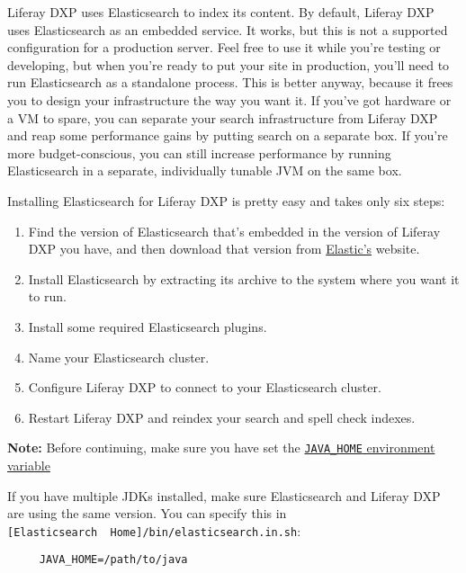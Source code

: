 Liferay DXP uses Elasticsearch to index its content. By default,
Liferay DXP uses Elasticsearch as an embedded service. It works, but this
is not a supported configuration for a production server. Feel free to
use it while you're testing or developing, but when you're ready to put
your site in production, you'll need to run Elasticsearch as a
standalone process. This is better anyway, because it frees you to
design your infrastructure the way you want it. If you've got hardware
or a VM to spare, you can separate your search infrastructure from
Liferay DXP and reap some performance gains by putting search on a
separate box. If you're more budget-conscious, you can still increase
performance by running Elasticsearch in a separate, individually tunable
JVM on the same box.

Installing Elasticsearch for Liferay DXP is pretty easy and takes only
six steps:

\begin{enumerate}
\def\labelenumi{\arabic{enumi}.}
\item
  Find the version of Elasticsearch that's embedded in the version of
  Liferay DXP you have, and then download that version from
  \href{https://www.elastic.co}{Elastic's} website.
\item
  Install Elasticsearch by extracting its archive to the system where
  you want it to run.
\item
  Install some required Elasticsearch plugins.
\item
  Name your Elasticsearch cluster.
\item
  Configure Liferay DXP to connect to your Elasticsearch cluster.
\item
  Restart Liferay DXP and reindex your search and spell check indexes.
\end{enumerate}

\noindent\hrulefill

\textbf{Note:} Before continuing, make sure you have set the
\href{https://docs.oracle.com/cd/E19182-01/820-7851/inst_cli_jdk_javahome_t/}{\texttt{JAVA\_HOME}
environment variable}

If you have multiple JDKs installed, make sure Elasticsearch and Liferay
DXP are using the same version. You can specify this in
\texttt{{[}Elasticsearch\ \ Home{]}/bin/elasticsearch.in.sh}:

\begin{verbatim}
     JAVA_HOME=/path/to/java
\end{verbatim}

\noindent\hrulefill

